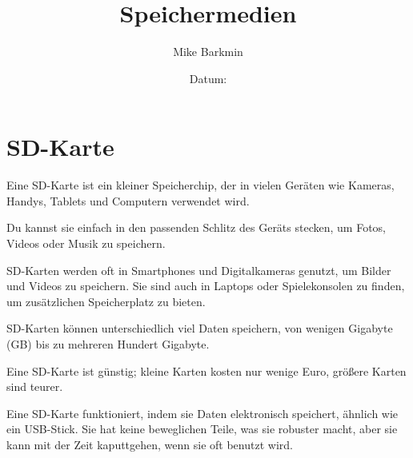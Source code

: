 \documentclass[a4paper,14pt]{scrartcl}
\title{Speichermedien}
\author{Mike Barkmin}
\date{Datum: \hspace{1.5cm}}
\begin{document}
\section*{ SD-Karte}

Eine SD-Karte ist ein kleiner Speicherchip, der in vielen Geräten wie Kameras, Handys, Tablets und Computern verwendet wird. 


Du kannst sie einfach in den passenden Schlitz des Geräts stecken, um Fotos, Videos oder Musik zu speichern. 

SD-Karten werden oft in Smartphones und Digitalkameras genutzt, um Bilder und Videos zu speichern. Sie sind auch in Laptops oder Spielekonsolen zu finden, um zusätzlichen Speicherplatz zu bieten. 

SD-Karten können unterschiedlich viel Daten speichern, von wenigen Gigabyte (GB) bis zu mehreren Hundert Gigabyte. 

Eine SD-Karte ist günstig; kleine Karten kosten nur wenige Euro, größere Karten sind teurer.

Eine SD-Karte funktioniert, indem sie Daten elektronisch speichert, ähnlich wie ein USB-Stick. Sie hat keine beweglichen Teile, was sie robuster macht, aber sie kann mit der Zeit kaputtgehen, wenn sie oft benutzt wird.
\end{document}
